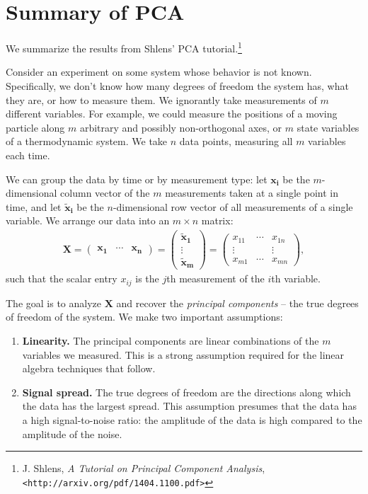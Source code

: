 \documentclass{article}
\renewcommand{\vec}{\mathbf}
\theoremstyle{definition}
\begin{document}
\section{Summary of PCA}

We summarize the results from Shlens' PCA tutorial.\footnote{J. Shlens,
\textit{A Tutorial on Principal Component Analysis},
\texttt{<http://arxiv.org/pdf/1404.1100.pdf>}}

Consider an experiment on some system whose behavior is not known.
Specifically, we don't know how many degrees of freedom the system has,
what they are, or how to measure them.
We ignorantly take measurements of $m$ different variables.
For example, we could measure the positions
of a moving particle along $m$ arbitrary and possibly non-orthogonal axes,
or $m$ state variables of a thermodynamic system. We take $n$ data points,
measuring all $m$ variables each time.

We can group the data by time or by measurement type: let $\vec{x_i}$
be the $m$-dimensional column vector of the $m$ measurements taken at
a single point in time, and let $\vec{\tilde x_i}$ be the $n$-dimensional
row vector of all measurements of a single variable. We arrange
our data into an $m \times n$ matrix:
\begin{align*}
\vec X =
\left(\begin{matrix}
\vec{x_1} & \cdots & \vec{x_n}
\end{matrix}\right)
=
\left(\begin{matrix}
\vec{\tilde x_1} \\
\vdots \\
\vec{\tilde x_m}
\end{matrix}\right)
=
\left(\begin{matrix}
x_{11} & \cdots & x_{1n} \\
\vdots & & \vdots \\
x_{m1} & \cdots & x_{mn}
\end{matrix}\right),
\end{align*}
such that the scalar entry $x_{ij}$
is the $j$th measurement of the $i$th variable.

The goal is to analyze $\vec X$ and recover the \emph{principal
components} -- the true degrees of freedom
of the system.
We make two important assumptions:
\begin{enumerate}
\item \textbf{Linearity.} The principal components are linear combinations
of the $m$ variables we measured. This is a strong assumption required
for the linear algebra techniques that follow.
\item \textbf{Signal spread.} The true degrees of freedom are the directions
along which the data has the largest spread. This assumption presumes
that the data has a high signal-to-noise ratio: the amplitude
of the data is high compared to the amplitude of the noise.
\end{enumerate}
\end{document}
